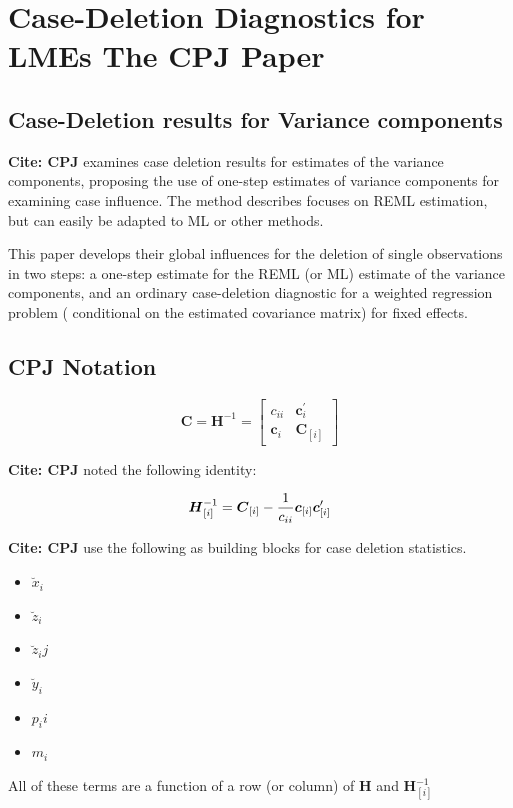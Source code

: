 \documentclass[12pt, a4paper]{article}
\theoremstyle{plain}
\theoremstyle{definition}
\theoremstyle{remark}
\begin{document}
\section{Case-Deletion Diagnostics for LMEs The CPJ Paper}%

\subsection{Case-Deletion results for Variance components}
\textbf{Cite: CPJ}  examines case deletion results for estimates of the variance components, proposing the use of one-step estimates of variance components for examining case influence. The method describes focuses on REML estimation, but can easily be adapted to ML or other methods.

This paper develops their global influences for the deletion of single observations in two steps: a one-step estimate for the REML (or ML) estimate of the variance components, and an ordinary case-deletion diagnostic for a weighted regression problem ( conditional on the estimated covariance matrix) for fixed effects.


\subsection{CPJ Notation} %

\[ \boldsymbol{C} = \boldsymbol{H}^{-1} = \left[
\begin{array}{cc}
c_{ii} & \boldsymbol{c}_{i}^{\prime}\\
\boldsymbol{c}_{i} &  \boldsymbol{C}_{[i]}
\end{array} \right]
\]

\textbf{Cite: CPJ}  noted the following identity:

\[ \boldsymbol{H}_{[i]}^{-1}  = \boldsymbol{C}_{[i]} - {1 \over c_{ii}}\boldsymbol{c}_{[i]}\boldsymbol{c}_{[i]}^{\prime} \]


\textbf{Cite: CPJ} use the following as building blocks for case deletion statistics.
\begin{itemize}
\item $\breve{x}_i$
\item $\breve{z}_i$
\item $\breve{z}_ij$
\item $\breve{y}_i$
\item $p_ii$
\item $m_i$
\end{itemize}
All of these terms are a function of a row (or column) of $\boldsymbol{H}$ and $\boldsymbol{H}_{[i]}^{-1}$





\end{document}
